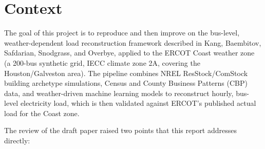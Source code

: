 \documentclass[11pt]{article}
\begin{document}
\begin{abstract}
A third phase (Sections~\ref{sec:areasplit}--\ref{sec:zonecal}) removes the three
remaining structural limitations. The winner-takes-all spatial join underlying every
earlier number --- one census tract or ZIP-code area to one bus --- is replaced by an
area-split allocation over the full 6{,}717-bus grid, conserving 100\% of Texas housing
units while raising the share of load-carrying buses receiving commercial load from
20.1\% to 96.1\% and lifting bus-level rank agreement with the grid case's own per-bus
load from $\rho=0.133$ to $0.475$ --- an improvement invisible to every zone-aggregate
metric, which is itself an argument for reporting a bus-level statistic. Validation is
then extended to \emph{all eight} ERCOT weather zones via a per-bus assignment carried
by the grid model itself, rather than the GIS shapefiles previously assumed necessary;
the zone-3B finding is sharpened, locating the weakness specifically in West Texas
($r=0.629$ for FAR WEST) rather than in dry climates generally. Calibration is finally
refitted per zone with a \emph{data-driven} industrial constant, scored out-of-sample:
Coast's factors do not transfer (applied statewide with no industrial term they already
reach 105\% of ERCOT's true peak), the refitted residential factors collapse from
1.6--1.9 to 1.07--1.36, and the missing weather-insensitive load is quantified at
18{,}079\,MW statewide, or 24.7\% of system peak.
\end{abstract}

\vspace{1.5em}
\tableofcontents
\listoffigures
\listoftables
\clearpage

\section{Context}

The goal of this project is to reproduce and then improve on the bus-level,
weather-dependent load reconstruction framework described in Kang, Baembitov,
Safdarian, Snodgrass, and Overbye, applied to the ERCOT Coast weather zone (a 200-bus
synthetic grid, IECC climate zone 2A, covering the Houston/Galveston area). The
pipeline combines NREL ResStock/ComStock building archetype simulations, Census and
County Business Patterns (CBP) data, and weather-driven machine learning models to
reconstruct hourly, bus-level electricity load, which is then validated against ERCOT's
published actual load for the Coast zone.

The review of the draft paper raised two points that this report addresses
directly:
\end{document}
